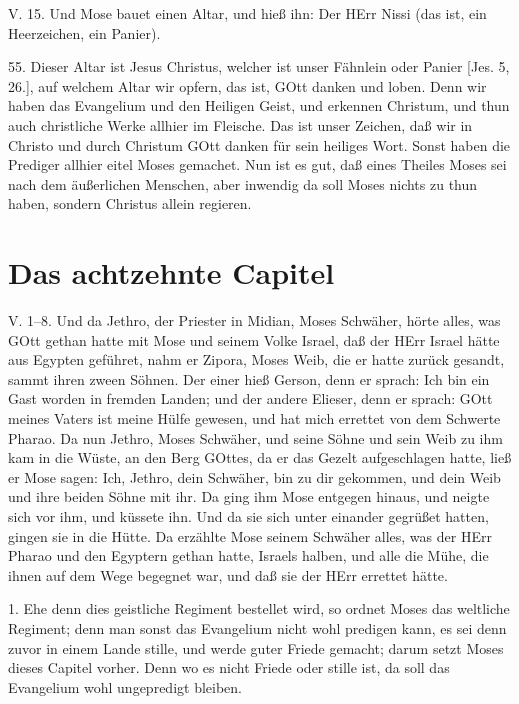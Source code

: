 \begin{schriftzitat}
V. 15. Und Mose bauet einen Altar, und hieß ihn: Der HErr Nissi (das ist, ein Heerzeichen, ein Panier).
\end{schriftzitat}

55. Dieser Altar ist Jesus Christus, welcher ist unser Fähnlein oder Panier [Jes. 5, 26.], auf welchem Altar wir opfern, das ist, GOtt danken und loben. Denn wir haben das Evangelium und den Heiligen Geist, und erkennen Christum, und thun auch christliche Werke allhier im Fleische. Das ist unser Zeichen, daß wir in Christo und durch Christum GOtt danken für sein heiliges Wort. Sonst haben die Prediger allhier eitel Moses gemachet. Nun ist es gut, daß eines Theiles Moses sei nach dem äußerlichen Menschen, aber inwendig da soll Moses nichts zu thun haben, sondern Christus allein regieren.

\section{Das achtzehnte Capitel}

\begin{schriftzitat}
V. 1–8. Und da Jethro, der Priester in Midian, Moses Schwäher, hörte alles, was GOtt gethan hatte mit Mose und seinem Volke Israel, daß der HErr Israel hätte aus Egypten geführet, nahm er Zipora, Moses Weib, die er hatte zurück gesandt, sammt ihren zween Söhnen. Der einer hieß Gerson, denn er sprach: Ich bin ein Gast worden in fremden Landen; und der andere Elieser, denn er sprach: GOtt meines Vaters ist meine Hülfe gewesen, und hat mich errettet von dem Schwerte Pharao. Da nun Jethro, Moses Schwäher, und seine Söhne und sein Weib zu ihm kam in die Wüste, an den Berg GOttes, da er das Gezelt aufgeschlagen hatte, ließ er Mose sagen: Ich, Jethro, dein Schwäher, bin zu dir gekommen, und dein Weib und ihre beiden Söhne mit ihr. Da ging ihm Mose entgegen hinaus, und neigte sich vor ihm, und küssete ihn. Und da sie sich unter einander gegrüßet hatten, gingen sie in die Hütte. Da erzählte Mose seinem Schwäher alles, was der HErr Pharao und den Egyptern gethan hatte, Israels halben, und alle die Mühe, die ihnen auf dem Wege begegnet war, und daß sie der HErr errettet hätte.
\end{schriftzitat}

1. Ehe denn dies geistliche Regiment bestellet wird, so ordnet Moses das weltliche Regiment; denn man sonst das Evangelium nicht wohl predigen kann, es sei denn zuvor in einem Lande stille, und werde guter Friede gemacht; darum setzt Moses dieses Capitel vorher. Denn wo es nicht Friede oder stille ist, da soll das Evangelium wohl ungepredigt bleiben.

